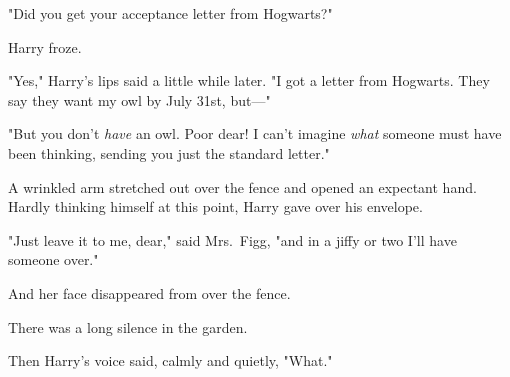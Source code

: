 "Did you get your acceptance letter from Hogwarts?"

Harry froze.

"Yes," Harry's lips said a little while later. "I got a letter
from Hogwarts. They say they want my owl by July 31st, but—"

"But you don't \emph{have} an owl. Poor dear! I can't imagine
\emph{what} someone must have been thinking, sending you just
the standard letter."

A wrinkled arm stretched out over the fence and opened
an expectant hand. Hardly thinking himself at this point,
Harry gave over his envelope.

"Just leave it to me, dear," said Mrs.~Figg, "and in a jiffy
or two I'll have someone over."

And her face disappeared from over the fence.

There was a long silence in the garden.

Then Harry's voice said, calmly and quietly, "What."
